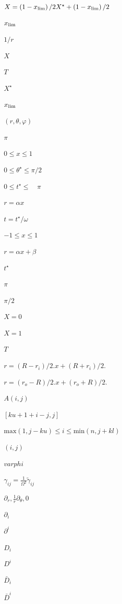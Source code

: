 \documentclass{article}
\begin{document}
$ X = \left(1 - x_{\rm lim}\right)/2 X^\star + \left(1 - x_{\rm lim}\right)/2 $
\pagebreak

$ x_{\rm lim}$
\pagebreak

$ 1/r$
\pagebreak

$ X$
\pagebreak

$ T$
\pagebreak

$ X^\star $
\pagebreak

$ x_{\rm lim} $
\pagebreak

$(r,\theta, \varphi)$
\pagebreak

$\pi$
\pagebreak

$ 0 \leq x \leq 1 $
\pagebreak

$ 0 \leq \theta^\star \leq \pi/2 $
\pagebreak

$ 0 \leq t^\star \leq \quad \pi$
\pagebreak

$ r = \alpha x $
\pagebreak

$ t = t^\star / \omega$
\pagebreak

$ -1 \leq x \leq 1 $
\pagebreak

$ r = \alpha x + \beta$
\pagebreak

$ t^\star$
\pagebreak

$ \pi$
\pagebreak

$\pi/2$
\pagebreak

$ X=0$
\pagebreak

$ X=1 $
\pagebreak

$T$
\pagebreak

$ r = (R - r_i)/2. x + (R + r_i)/2. $
\pagebreak

$ r = (r_o - R)/2. x + (r_o + R)/2. $
\pagebreak

$ A(i, j)$
\pagebreak

$[ku+1+i-j, j]$
\pagebreak

$\mathrm {max}(1, j-ku) \leq i \leq \mathrm{min} (n, j+kl)$
\pagebreak

$ (i,j) $
\pagebreak

$varphi$
\pagebreak

$\gamma_{ij} = \frac{1}{\Omega^2}\tilde{\gamma}_{ij}$
\pagebreak

$ \partial_r, \frac{1}{r}\partial_\theta, 0$
\pagebreak

$\partial_i$
\pagebreak

$\partial^i$
\pagebreak

$D_i$
\pagebreak

$D^i$
\pagebreak

$\bar{D}_i$
\pagebreak

$\bar{D}^i$
\pagebreak
\end{document}
